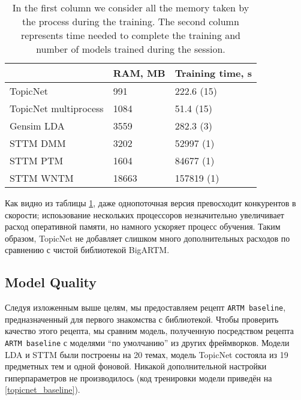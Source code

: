 \begin{table}[h]
\begin{tabular}{|l|l|l|}
\hline
                      & \multicolumn{1}{c|}{RAM, MB} & \multicolumn{1}{c|}{Training time, s} \\ \hline
TopicNet              & 991                         & 222.6 (15)                             \\ \hline
TopicNet multiprocess & 1084                        & 51.4 (15)                              \\ \hline
Gensim LDA            & 3559                        & 282.3 (3)                              \\ \hline
STTM DMM              & 3202                        & 52997 (1)                              \\ \hline
STTM PTM              & 1604                        & 84677 (1)                              \\ \hline
STTM WNTM             & 18663                       & 157819 (1)                             \\ \hline
\end{tabular}
\caption{In the first column we consider all the memory taken by the process during the training. The second column represents time needed to complete the training and number of models trained during the session.}
\label{performance-benchmark}
\end{table}

Как видно из таблицы \ref{performance-benchmark}, даже однопоточная версия превосходит конкурентов в скорости; испоьзование нескольких процессоров незначительно увеличивает расход оперативной памяти, но намного ускоряет процесс обучения. Таким образом, TopicNet не добавляет слишком много дополнительных расходов по сравнению с чистой библиотекой BigARTM.

\subsection{Model Quality} 

Следуя изложенным выше целям, мы предоставляем рецепт \texttt{ARTM baseline}, предназначенный для первого знакомства с библиотекой. Чтобы проверить качество этого рецепта, мы сравним модель, полученную посредством рецепта \texttt{ARTM baseline} с моделями ``по умолчанию'' из других фреймворков. Модели LDA и STTM были построены на 20 темах, модель TopicNet состояла из 19 предметных тем и одной фоновой. Никакой дополнительной настройки гиперпараметров не производилось (код тренировки модели приведён на \ref{topicnet_baseline}). 

